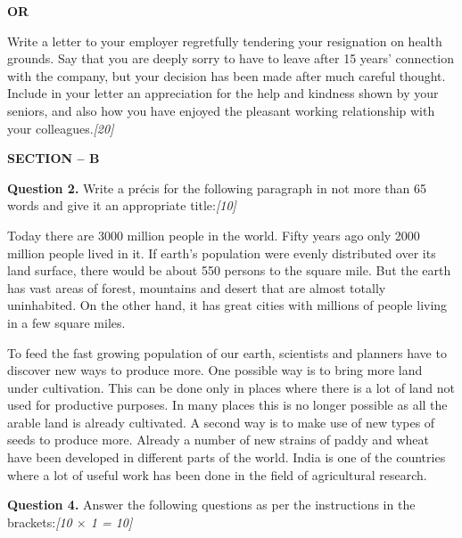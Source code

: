 \documentclass[11pt,a4paper]{article}
\newcommand{\pts}[1]{\hfill   \textit{[#1]}}
\begin{document}
\centerline{   \textbf{OR}}

Write a letter to your employer regretfully tendering your resignation on health grounds. Say that you are deeply sorry to have to leave after 15 years' connection with the company, but your decision has been made after much careful thought. Include in your letter an appreciation for the help and kindness shown by your seniors, and also how you have enjoyed the pleasant working relationship with your colleagues.\pts{20}

\bigskip


\begin{center}
   \textbf{\large SECTION -- B}
\end{center}




\noindent   \textbf{Question 2.} Write a précis for the following paragraph in not more than 65 words and give it an appropriate title:\pts{10}

Today there are 3000 million people in the world. Fifty years ago only 2000 million people lived in it. If earth's population were evenly distributed over its land surface, there would be about 550 persons to the square mile. But the earth has vast areas of forest, mountains and desert that are almost totally uninhabited. On the other hand, it has great cities with millions of people living in a few square miles. 

To feed the fast growing population of our earth, scientists and planners have to discover new ways to produce more. One possible way is to bring more land under cultivation. This can be done only in places where there is a lot of land not used for productive purposes. In many places this is no longer possible as all the arable land is already cultivated. A second way is to make use of new types of seeds to produce more. Already a number of new strains of paddy and wheat have been developed in different parts of the world. India is one of the countries where a lot of useful work has been done in the field of agricultural research.

\bigskip




\noindent   \textbf{Question 4.} Answer the following questions as per the instructions in the brackets:\pts{10 $ \times$ 1 = 10}
\end{document}
